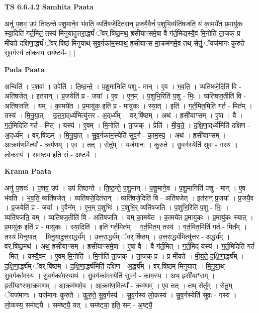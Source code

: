 \documentclass[17pt]{extarticle}
\begin{document}
\textbf{TS 6.6.4.2 } \newline
\textbf{Samhita Paata} \newline

अनु॑ प॒शव॒ उप॑ तिष्ठन्ते पशु॒माने॒व भ॑वति॒ व्यति॑षजे॒दित॑रान् प्र॒जयै॒वैनं॑ प॒शुभि॒र्व्यति॑षजति॒ यं का॒मये॑त प्र॒मायु॑कः स्या॒दिति॑ गर्त॒मितं॒ तस्य॑ मिनुयादुत्तरा॒र्द्ध्यं॑ ॅवर्.षि॑ष्ठ॒मथ॒ ह्रसी॑याꣳसमे॒षा वै ग॑र्त॒मिद्यस्यै॒वं मि॒नोति॑ ता॒जक् प्र मी॑यते दक्षिणा॒र्द्ध्यं॑ ॅवर्.षि॑ष्ठं मिनुयाथ् सुव॒र्गका॑म॒स्याथ॒ ह्रसी॑याꣳस-मा॒क्रम॑णमे॒व तथ् सेतुं॒ ॅयज॑मानः कुरुते सुव॒र्गस्य॑ लो॒कस्य॒ सम॑ष्ट्यै॒- [  ] \newline

\textbf{Pada Paata} \newline

अन्विति॑ । प॒शवः॑ । उपेति॑ । ति॒ष्ठ॒न्ते॒ । प॒शु॒मानिति॑ पशु - मान् । ए॒व । भ॒व॒ति॒ । व्यति॑षजे॒दिति॑ वि - अति॑षजेत् । इत॑रान् । प्र॒जयेति॑ प्र - जया᳚ । ए॒व । ए॒न॒म् । प॒शुभि॒रिति॑ प॒शु - भिः॒ । व्यति॑षज॒तीति॑ वि - अति॑षजति । यम् । का॒मये॑त । प्र॒मायु॑क॒ इति॑ प्र - मायु॑कः । स्या॒त् । इति॑ । ग॒र्त॒मित॒मिति॑ गर्त - मित᳚म् । तस्य॑ । मि॒नु॒या॒त् । उ॒त्त॒रा॒द्‌र्ध्य॑मित्यु॑त्तर - अ॒द्‌र्ध्य᳚म् । वर्.षि॑ष्ठम् । अथ॑ । ह्रसी॑याꣳसम् । ए॒षा । वै । ग॒र्त॒मिदिति॑ गर्त - मित् । यस्य॑ । ए॒वम् । मि॒नोति॑ । ता॒जक् । प्रेति॑ । मी॒य॒ते॒ । द॒क्षि॒णा॒द्‌र्ध्य॑मिति॑ दक्षिण - अ॒द्‌र्ध्य᳚म् । वर्.षि॑ष्ठम् । मि॒नु॒या॒त् । सु॒व॒र्गका॑म॒स्येति॑ सुव॒र्ग - का॒म॒स्य॒ । अथ॑ । ह्रसी॑याꣳसम् । आ॒क्रम॑ण॒मित्या᳚ - क्रम॑णम् । ए॒व । तत् । सेतु᳚म् । यज॑मानः । कु॒रु॒ते॒ । सु॒व॒र्गस्येति॑ सुवः - गस्य॑ । लो॒कस्य॑ । सम॑ष्ट्य॒ इति॒ सं - अ॒ष्ट्यै॒ ।  \newline


\textbf{Krama Paata} \newline

अनु॑ प॒शवः॑ । प॒शव॒ उप॑ । उप॑ तिष्ठन्ते । ति॒ष्ठ॒न्ते॒ प॒शु॒मान् । प॒शु॒माने॒व । प॒शु॒मानिति॑ पशु - मान् । ए॒व भ॑वति । भ॒व॒ति॒ व्यति॑षजेत् । व्यति॑षजे॒दित॑रान् । व्यति॑षजे॒दिति॑ वि - अति॑षजेत् । इत॑रान् प्र॒जया᳚ । प्र॒जयै॒व । प्र॒जयेति॑ प्र - जया᳚ । ए॒वैन᳚म् । ए॒न॒म् प॒शुभिः॑ । प॒शुभि॒र् व्यति॑षजति । प॒शुभि॒रिति॑ प॒शु - भिः॒ । व्यति॑षजति॒ यम् । व्यति॑षज॒तीति॑ वि - अति॑षजति । यम् का॒मये॑त । का॒मये॑त प्र॒मायु॑कः । प्र॒मायु॑कः स्यात् । प्र॒मायु॑क॒ इति॑ प्र - मायु॑कः । स्या॒दिति॑ । इति॑ गर्त॒मित᳚म् । ग॒र्त॒मित॒म् तस्य॑ । ग॒र्त॒मित॒मिति॑ गर्त - मित᳚म् । तस्य॑ मिनुयात् । मि॒नु॒या॒दु॒त्त॒रा॒र्द्ध्य᳚म् । उ॒त्त॒रा॒र्द्ध्य॑म् ॅवर्.षि॑ष्ठम् । उ॒त्त॒रा॒र्द्ध्य॑मित्यु॑त्तर - अ॒र्द्ध्य᳚म् । वर्.षि॑ष्ठ॒मथ॑ । अथ॒ ह्रसी॑याꣳसम् । ह्रसी॑याꣳसमे॒षा । ए॒षा वै । वै ग॑र्त॒मित् । ग॒र्त॒मिद् यस्य॑ । ग॒र्त॒मिदिति॑ गर्त - मित् । यस्यै॒वम् । ए॒वम् मि॒नोति॑ । मि॒नोति॑ ता॒जक् । ता॒जक् प्र । प्र मी॑यते । मी॒य॒ते॒ द॒क्षि॒णा॒र्द्ध्य᳚म् । द॒क्षि॒णा॒र्द्ध्य॑म् ॅवर्.षि॑ष्ठम् । द॒क्षि॒णा॒र्द्ध्य॑मिति॑ दक्षिण - अ॒र्द्ध्य᳚म् । वर्.षि॑ष्ठम् मिनुयात् । मि॒नु॒या॒थ् सु॒व॒र्गका॑मस्य । सु॒व॒र्गका॑म॒स्याथ॑ । सु॒व॒र्गका॑म॒स्येति॑ सुव॒र्ग - का॒म॒स्य॒ । अथ॒ ह्रसी॑याꣳसम् । ह्रसी॑याꣳसमा॒क्रम॑णम् । आ॒क्रम॑णमे॒व । आ॒क्रम॑ण॒मित्या᳚ - क्रम॑णम् । ए॒व तत् । तथ् सेतु᳚म् । सेतु॒म् ॅयज॑मानः । यज॑मानः कुरुते । कु॒रु॒ते॒ सु॒व॒र्गस्य॑ । सु॒व॒र्गस्य॑ लो॒कस्य॑ । सु॒व॒र्गस्येति॑ सुवः - गस्य॑ । लो॒कस्य॒ सम॑ष्ट्‍यै । सम॑ष्ट्‍यै॒ यत् । सम॑ष्ट्‍या॒ इति॒ सम् - अ॒ष्ट्‍यै॒ \newline
\end{document}
